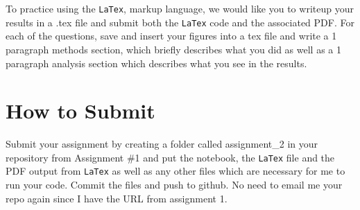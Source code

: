 \documentclass{article}
\begin{document}
To practice using the \texttt{LaTex}, markup language, we would like you to writeup your results in a .tex file and submit both the \texttt{LaTex} code and the associated PDF. For each of the questions, save and insert your figures into a tex file and write a 1 paragraph methods section, which briefly describes what you did as well as a 1 paragraph analysis section which describes what you see in the results.

\section*{How to Submit}

Submit your assignment by creating a folder called assignment\_2 in your repository from Assignment \#1 and put the notebook, the \texttt{LaTex} file and the PDF output from \texttt{LaTex} as well as any other files which are necessary for me to run your code. Commit the files and push to github. No need to email me your repo again since I have the URL from assignment 1.
\end{document}
